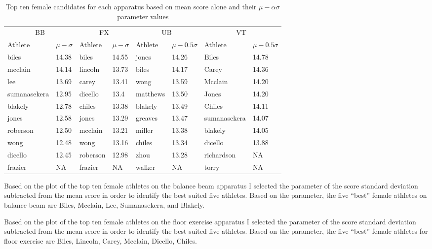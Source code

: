 \documentclass[12pt]{article}
\begin{document}
\begin{table}
  \caption{Top ten female candidates for each apparatus based on mean score alone and 
  their $\mu - \alpha \sigma$ parameter values}
  \label{tab:tableBBP}
\centering
\begin{tabular}[t]{llllllll}
 \toprule
  \multicolumn{2}{c}{BB} & \multicolumn{2}{c}{FX} & \multicolumn{2}{c}{UB} & \multicolumn{2}{c}{VT}\\
  \cmidrule(lr){1-2}\cmidrule(lr){3-4}\cmidrule(lr){5-6}\cmidrule(lr){7-8}
Athlete & $\mu - \sigma$ & Athlete & $\mu - \sigma$ & Athlete & $\mu - 0.5 \sigma$ & Athlete & $\mu - 0.5 \sigma$\\
\midrule
biles & 14.38 & biles & 14.55 & jones & 14.26 & Biles & 14.78\\
\midrule
mcclain & 14.14 & lincoln & 13.73 & biles & 14.17 & Carey & 14.36\\
\midrule
lee & 13.69 & carey & 13.41 & wong & 13.59 & Mcclain & 14.20\\
\midrule
sumanasekera & 12.95 & dicello & 13.4 & matthews & 13.50 & Jones & 14.20\\
\midrule
blakely & 12.78 & chiles & 13.38 & blakely & 13.49 & Chiles & 14.11\\
\midrule
jones & 12.58 & jones & 13.29 & greaves & 13.47 & sumanasekera & 14.07\\
\midrule
roberson & 12.50 & mcclain & 13.21 & miller & 13.38 & blakely & 14.05\\
\midrule
wong & 12.48 & wong & 13.16 & chiles & 13.34 & dicello & 13.88\\
\midrule
dicello & 12.45 & roberson & 12.98 & zhou & 13.28 & richardson & NA\\
\midrule
frazier & NA & frazier & NA & walker & NA & torry & NA\\
\bottomrule
\end{tabular}
\end{table}

Based on the plot of the top ten female athletes on the balance beam apparatus I selected the parameter of 
the score standard deviation subtracted from the mean score in order to identify the best suited five 
athletes. Based on the parameter, the five ``best'' female athletes on balance beam are Biles, Mcclain, 
Lee, Sumanasekera, and Blakely.



Based on the plot of the top ten female athletes on the floor exercise apparatus I selected the parameter of 
the score standard deviation subtracted from the mean score in order to identify the best suited five 
athletes. Based on the parameter, the five ``best'' female athletes for floor exercise are Biles, Lincoln, Carey, 
Mcclain, Dicello, Chiles.
\end{document}
